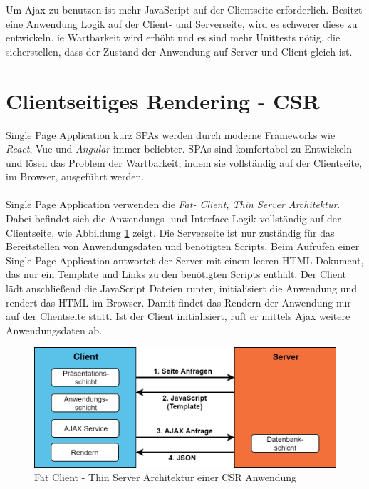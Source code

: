\documentclass[runningheads]{llncs}
\begin{document}
Um Ajax zu benutzen ist mehr JavaScript auf der Clientseite erforderlich. 
Besitzt eine Anwendung Logik auf der Client- und Serverseite, 
wird es schwerer diese zu entwickeln. 
ie Wartbarkeit wird erhöht und es sind mehr Unittests nötig, 
die sicherstellen, dass der Zustand der Anwendung auf Server und 
Client gleich ist. 
\newpage

\section{Clientseitiges Rendering - CSR}
\label{sec:Clientseitiges Rendering}
Single Page Application kurz SPAs werden durch moderne Frameworks wie \textit{React}, 
Vue und \textit{Angular} immer beliebter. SPAs sind komfortabel zu Entwickeln 
und lösen das Problem der Wartbarkeit, 
indem sie vollständig auf der Clientseite, 
im Browser, ausgeführt werden.
\\
\\
Single Page Application verwenden die \textit{Fat- Client, Thin Server Architektur}. 
Dabei befindet sich die Anwendungs- und Interface Logik vollständig auf der Clientseite, wie Abbildung 
\ref{Fat Client - Thin Server Architektur einer CSR Anwendung} zeigt.
Die Serverseite ist nur zuständig für das Bereitstellen von Anwendungsdaten 
und benötigten Scripts. 
Beim Aufrufen einer Single Page Application antwortet der Server 
mit einem leeren HTML Dokument, das nur ein Template und Links 
zu den benötigten Scripts enthält. 
Der Client lädt anschließend die JavaScript Dateien runter, 
initialisiert die Anwendung und rendert das HTML im Browser. 
Damit findet das Rendern der Anwendung nur auf der Clientseite statt. 
Ist der Client initialisiert, ruft er mittels Ajax weitere Anwendungsdaten ab. 
\begin{figure}[h]
  \centering
  \includegraphics[width=12cm]{images/client}
  \caption{Fat Client - Thin Server Architektur einer CSR Anwendung}
  \label{Fat Client - Thin Server Architektur einer CSR Anwendung}
\end{figure}
\end{document}
